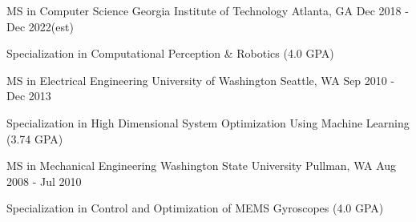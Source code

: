 

\begin{cventries}

  \cventry
    {MS in Computer Science} %
    {Georgia Institute of Technology} %
    {Atlanta, GA} %
    {Dec 2018 - Dec 2022(est)} %
    {
      \begin{cvitems} %
        \item {Specialization in Computational Perception \& Robotics (4.0 GPA)}
      \end{cvitems}
    }
    
  \cventry
    {MS in Electrical Engineering} %
    {University of Washington} %
    {Seattle, WA} %
    {Sep 2010 - Dec 2013} %
    {
      \begin{cvitems} %
        \item {Specialization in High Dimensional System Optimization Using Machine Learning (3.74 GPA)}
      \end{cvitems}
    } 
    
\cventry
    {MS in Mechanical Engineering} %
    {Washington State University} %
    {Pullman, WA} %
    {Aug 2008 - Jul 2010} %
    {
      \begin{cvitems} %
        \item {Specialization in Control and Optimization of MEMS Gyroscopes (4.0 GPA)}
      \end{cvitems}
    }

\end{cventries}
